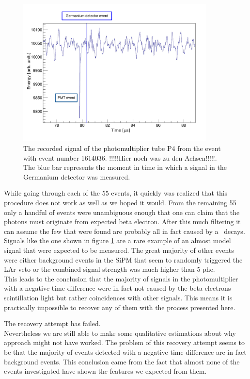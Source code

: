 \documentclass[encoding=utf8,british]{tumphthesis}
\begin{document}
\begin{figure}[t!]
	\centering
	\ifmakefigures%
	\includegraphics[width=100mm]{./Bilder/BeispielSignal.pdf}
	\fi%

	\caption{
    The recorded signal of the photomultiplier tube P4 from the event with event number 1614036. !!!!!Hier noch was zu den Achsen!!!!!. 
    The blue bar represents the moment in time in which a signal in the Germanium detector was measured.
	}
    	\label{fig:BeispielSignal}
\end{figure}

While going through each of the 55 events, it quickly was realized that this procedure does not work as well as we hoped it would.
From the remaining 55 only a handful of events were unambiguous enough that one can claim that the photons must originate from expected beta electron.
After this much filtering it can assume the few that were found are probably all in fact caused by a \Kr\ decays.
Signals like the one shown in figure \ref{fig:BeispielSignal} are a rare example of an almost model signal that were expected to be measured.
The great majority of other events were either background events in the SiPM that seem to randomly triggered the LAr veto or the combined signal strength was much higher than 5 phe.\\

This leads to the conclusion that the majority of signals in the photomultiplier with a negative time difference were in fact not caused by the beta electrons scintillation light but rather coincidences with other signals.
This means it is practically impossible to recover any of them with the process presented here.

The recovery attempt has failed.
\\

Nevertheless we are still able to make some qualitative estimations about why approach might not have worked. 
The problem of this recovery attempt seems to be that the majority of events detected with a negative time difference are in fact background events.
This conclusion came from the fact that almost none of the events investigated have shown the features we expected from them.
\end{document}
